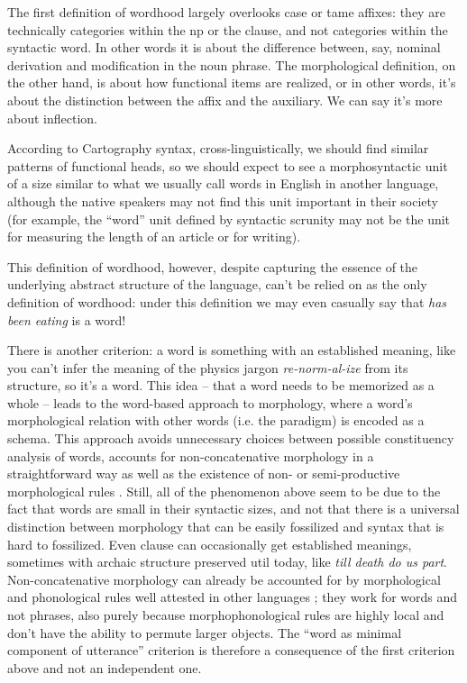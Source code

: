 \documentclass[a4paper, oneside, 12pt]{report}
\newcommand*{\citechap}[1]{chap.~{#1}}
\newcommand{\form}[1]{\emph{#1}}
\begin{document}
{The first definition of wordhood largely overlooks 
case or \acs{tame} affixes:
they are technically categories within the \acs{np} or the clause, 
and not categories within the syntactic word.
In other words it is about the difference 
between, say, nominal derivation and modification in the noun phrase.
The morphological definition, on the other hand, 
is about how functional items are realized, 
or in other words, it's about the distinction 
between the affix and the auxiliary.
We can say it's more about inflection.

According to Cartography syntax, 
cross-linguistically, 
we should find similar patterns of functional heads,
so we should expect to see a morphosyntactic unit 
of a size similar to what we usually call words in English 
in another language, 
although the native speakers may not find this unit important in their society 
(for example, the ``word'' unit defined by syntactic scrunity 
may not be the unit for measuring the length of an article or for writing).

This definition of wordhood, however, 
despite capturing the essence of the underlying abstract structure of the language, 
can't be relied on as the only definition of wordhood:
under this definition we may even casually say that 
\form{has been eating} is a word!

There is another criterion: 
a word is something with an established meaning,
like you can't infer the meaning of the physics jargon \form{re-norm-al-ize} 
from its structure, so it's a word.
This idea -- that a word needs to be memorized as a whole -- 
leads to the word-based approach to morphology,
where a word's morphological relation with other words (i.e. the paradigm)
is encoded as a schema.
This approach avoids unnecessary choices between possible constituency analysis of words,
accounts for non-concatenative morphology in a straightforward way
as well as the existence of non- or semi-productive morphological rules
\citep[\citechap{3, 4}]{haspelmath2013understanding}.
Still, all of the phenomenon above
seem to be due to the fact that 
words are small in their syntactic sizes, 
and not that there is a universal distinction 
between morphology that can be easily fossilized 
and syntax that is hard to fossilized.
Even clause can occasionally get established meanings,
sometimes with archaic structure preserved util today,
like \form{till death do us part}.
Non-concatenative morphology can already be accounted for 
by morphological and phonological rules well attested in other languages 
\citep{tucker2011morphosyntax};
they work for words and not phrases, 
also purely because morphophonological rules are highly local 
and don't have the ability to permute larger objects.
The ``word as minimal component of utterance'' 
criterion is therefore a consequence of the first criterion above 
and not an independent one.

}
\end{document}
